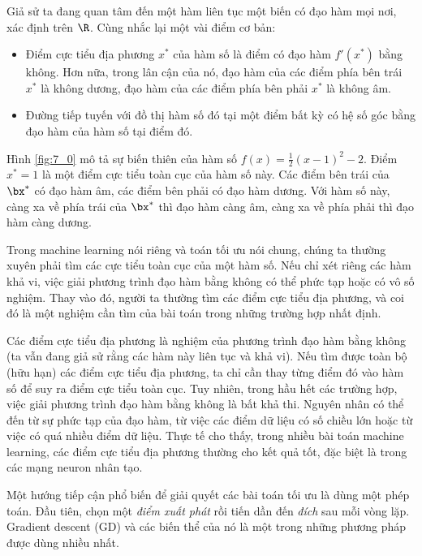 Giả sử ta đang quan tâm đến một hàm liên tục một biến có đạo hàm mọi nơi, xác
định trên $\R$. Cùng nhắc lại một vài điểm cơ bản:
\begin{itemize}
\item Điểm cực tiểu địa phương $x^*$ của hàm số là điểm có đạo hàm $f'(x^*)$
bằng không. Hơn nữa, trong lân cận của nó, đạo hàm của các điểm phía bên
trái $x^*$ là không dương, đạo hàm của các điểm phía bên phải $x^*$ là không
âm.

\item Đường tiếp tuyến với đồ thị hàm số đó tại một điểm bất kỳ có hệ số góc
bằng đạo hàm của hàm số tại điểm đó.
\end{itemize}

Hình \ref{fig:7_0} mô tả sự biến thiên của hàm số $f(x) = \frac{1}{2}(x - 1)^2 -
2$. Điểm $x^* = 1$ là một điểm cực tiểu toàn cục của hàm số này. Các điểm bên
trái của $\bx^*$ có đạo hàm âm, các điểm bên phải có đạo hàm dương. Với
hàm số này, càng xa về phía trái của $\bx^*$ thì đạo hàm càng âm, càng xa về
phía phải thì đạo hàm càng dương.


Trong machine learning nói riêng và toán tối ưu nói chung, chúng ta thường xuyên
phải tìm các cực tiểu toàn cục của một hàm số. Nếu chỉ xét riêng các hàm khả vi,
việc giải phương trình đạo hàm bằng không có thể phức tạp hoặc có vô số nghiệm.
Thay vào đó, người ta thường tìm các điểm cực tiểu địa phương, và coi đó là một
nghiệm cần tìm của bài toán trong những trường hợp nhất định.

Các điểm cực tiểu địa phương là nghiệm của phương trình đạo hàm bằng không (ta
vẫn đang giả sử rằng các hàm này liên tục và khả vi). Nếu tìm được toàn bộ (hữu
hạn) các điểm cực tiểu địa phương, ta chỉ cần thay từng điểm đó vào hàm số để
suy ra điểm cực tiểu toàn cục. Tuy nhiên, trong hầu hết các trường hợp, việc
giải phương trình đạo hàm bằng không là bất khả thi. Nguyên nhân có thể đến từ
sự phức tạp của đạo hàm, từ việc các điểm dữ liệu có số chiều lớn hoặc từ việc
có quá nhiều điểm dữ liệu. Thực tế cho thấy, trong nhiều bài toán machine
learning, các điểm cực tiểu địa phương thường cho kết quả tốt, đặc biệt là
trong các mạng neuron nhân tạo.

Một hướng tiếp cận phổ biến để giải quyết các bài toán tối ưu là dùng một phép
toán. Đầu tiên, chọn một \textit{điểm xuất phát} rồi tiến dần đến \textit{đích}
sau mỗi vòng lặp. Gradient descent (GD) và các biến thể của nó là một trong
những phương pháp được dùng nhiều nhất.

